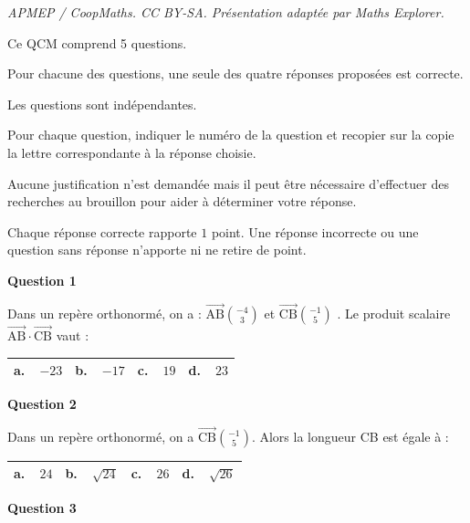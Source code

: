 \documentclass[10pt]{article}
\providecommand{\vect}[1]{\overrightarrow{#1}}
\begin{document}
\noindent\textit{APMEP / CoopMaths. CC BY-SA. Présentation adaptée par Maths Explorer.}\par\medskip
\medskip

Ce QCM comprend 5 questions.

Pour chacune des questions, une seule des quatre réponses proposées est correcte.

Les questions sont indépendantes.

Pour chaque question, indiquer le numéro de la question et recopier sur la copie la lettre correspondante à la réponse choisie.

Aucune justification n'est demandée mais il peut être nécessaire d'effectuer des recherches au brouillon pour aider à déterminer votre réponse.

Chaque réponse correcte rapporte $1$ point. Une réponse incorrecte ou une question sans réponse n'apporte ni ne retire de point.

\medskip

\textbf{Question 1}

\medskip

Dans un repère orthonormé, on a : $\vect{\text{AB}}\binom{-4}{3}$  et $\vect{\text{CB}}\binom{- 1}{5}$ . Le produit scalaire $\vect{\text{AB}} \cdot \vect{\text{CB}}$ vaut :

\begin{center}
\begin{tabularx}{\linewidth}{|*{4}{X|}}\hline
\textbf{a.~~}$- 23$ &\textbf{b.~~}$- 17$&\textbf{c.~~}$19$&\textbf{d.~~}$23$\\ \hline
\end{tabularx}
\end{center}

\medskip

\textbf{Question 2}

\medskip

Dans un repère orthonormé, on a $\vect{\text{CB}}\binom{-1}{5}$. Alors la longueur CB est égale à :

\begin{center}
\begin{tabularx}{\linewidth}{|*{4}{X|}}\hline
\textbf{a.~~}$24$ &\textbf{b.~~}$\sqrt{24}$&\textbf{c.~~}$26$&\textbf{d.~~}$\sqrt{26}$\rule[-3mm]{0mm}{9mm}\\ \hline
\end{tabularx}
\end{center}

\medskip

\textbf{Question 3}
\end{document}
